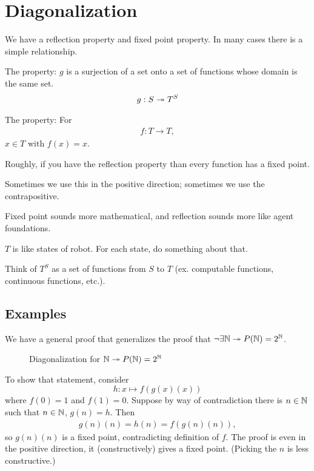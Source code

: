 \documentclass[11pt]{article}
\begin{document}

\section{Diagonalization}

We have a reflection property and fixed point property. In many cases there is a simple relationship.

\begin{df}
The  property: $g$ is a surjection of a set onto a set of functions whose domain is the same set.
\begin{align}
g:S\twoheadrightarrow T^S
\end{align}
\end{df}
\begin{df}
The  property: For 
\begin{align}
f:T\to T,
\end{align}
$x\in T$ with $f(x)=x$.
\end{df}
Roughly, if you have the reflection property than every function has a fixed point.

Sometimes we use this in the positive direction; sometimes we use the contrapositive.

Fixed point sounds more mathematical, and reflection sounds more like agent foundations.

$T$ is like states of robot. For each state, do something about that.

Think of $T^S$ as a set of functions from $S$ to $T$ (ex. computable functions, continuous functions, etc.). 

\subsection{Examples}

We have a general proof that generalizes the proof that $\neg \exists \mathbb{N}\twoheadrightarrow P(\mathbb{N}) = 2^{\mathbb{N}}$. 

\begin{figure}
\caption{Diagonalization for $\mathbb{N}\twoheadrightarrow P(\mathbb{N})=2^{\mathbb{N}}$
}
\end{figure}
To show that statement, consider
$$
h: x\mapsto f(g(x)(x))
$$
where $f(0)=1$ and $f(1)=0$. Suppose by way of contradiction there is $n\in \mathbb{N}$ such that $n\in \mathbb{N}$, $g(n)=h$. Then
\begin{align}
g(n)(n)= h(n) = f(g(n)(n)),
\end{align}
so $g(n)(n)$ is a fixed point, contradicting definition of $f$. 
The proof is even in the positive direction, it (constructively) gives a fixed point. (Picking the $n$ is less constructive.)
\end{document}
